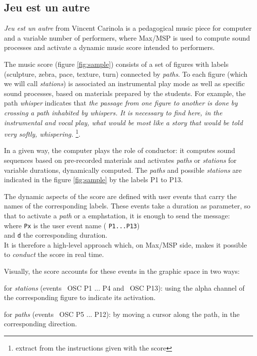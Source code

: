 \documentclass{article}
\newcommand{\OSC}[1]	{{\fontsize{9pt}{9pt} \selectfont\texttt{#1}}}
\newcommand{\tab}{\hspace*{4mm}}
\let\olditemize\itemize
\let\oldenditemize\enditemize
\renewenvironment{itemize} 	{\olditemize \renewcommand{\labelitemi}{$\bullet$} \setlength{\itemsep}{0mm}}{\oldenditemize}
\begin{document}
\subsection{Jeu est un autre}

\emph{Jeu est un autre} from Vincent Carinola is a pedagogical music piece for computer and a variable number of performers, where Max/MSP is used to compute sound processes and activate a dynamic music score intended to performers. 

The music score (figure \ref{fig:sample}) consists of a set of figures with labels (sculpture, zebra, pace, texture, turn) connected by \emph{paths}. To each figure (which we will call \emph{stations}) is associated an instrumental play mode as well as specific sound processes, based on materials prepared by the students. For example, the path \emph{whisper} indicates that \emph{the passage from one figure to another is done by crossing a path inhabited by whispers. It is necessary to find here, in the instrumental and vocal play, what would be most like a story that would be told very softly, whispering.} \footnote{extract from the instructions given with the score}.

In a given way, the computer plays the role of conductor: it computes sound sequences based on pre-recorded materials and activates \emph{paths} or \emph{stations} for variable durations, dynamically computed. The \emph{paths} and possible \emph{stations} are indicated in the figure \ref{fig:sample} by the labels P1 to P13.

The dynamic aspects of the score are defined with user events that carry the names of the corresponding labels. These events take a duration as parameter, so that to activate a \emph{path} or a emph{station}, it is enough to send the message:
\tab \tab \OSC{/ITL/scene Px d} \\
where \OSC{Px} is the user event name (\OSC{P1...P13})\\
 and \OSC{d} the corresponding duration. \\
It is therefore a high-level approach which, on Max/MSP side, makes it possible to \emph{conduct} the score in real time.

Visually, the score accounts for these events in the graphic space in two ways:
\begin{itemize}
\item for \emph{stations} (events \ OSC {P1 ... P4} and \ OSC {P13}): using the alpha channel of the corresponding figure to indicate its activation.
\item for \emph{paths} (events \ OSC {P5 ... P12}): by moving a cursor along the path, in the corresponding direction.
\end{itemize}
\end{document}
